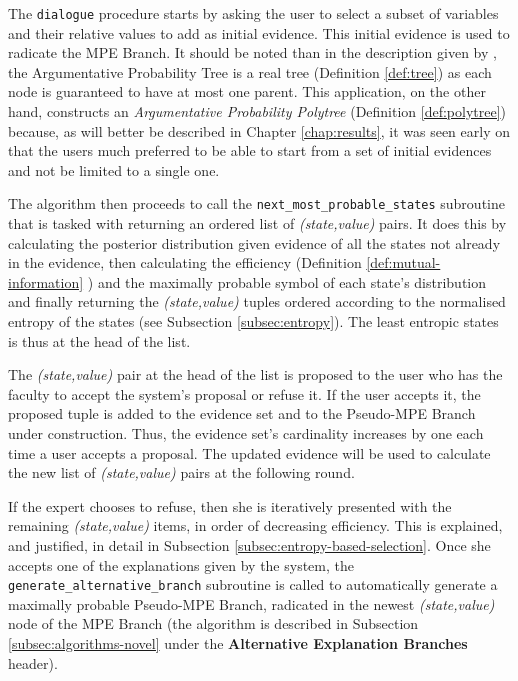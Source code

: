 The \texttt{dialogue} procedure starts by asking the user to select a subset of variables and their relative values to add as initial evidence.
This initial evidence is used to radicate the MPE Branch.
It should be noted than in the description given by \citet{Butz2018}, the Argumentative Probability Tree is a real tree (Definition \ref{def:tree}) as each node is guaranteed to have at most one parent.
This application, on the other hand, constructs an \textit{Argumentative Probability Polytree} (Definition \ref{def:polytree}) because, as will better be described in Chapter \ref{chap:results}, it was seen early on that the users much preferred to be able to start from a set of initial evidences and not be limited to a single one.

The algorithm then proceeds to call the \texttt{next\_most\_probable\_states} subroutine that is tasked with returning an ordered list of \textit{(state,value)} pairs.
It does this by calculating the posterior distribution given evidence of all the states not already in the evidence, then calculating the efficiency (Definition \ref{def:mutual-information} ) and the maximally probable symbol of each state's distribution and finally returning the \textit{(state,value)} tuples ordered according to the normalised entropy of the states (see Subsection \ref{subsec:entropy}).
The least entropic states is thus at the head of the list.

The \textit{(state,value)} pair at the head of the list is proposed to the user who has the faculty to accept the system's proposal or refuse it.
If the user accepts it, the proposed tuple is added to the evidence set and to the Pseudo-MPE Branch under construction.
Thus, the evidence set's cardinality increases by one each time a user accepts a proposal.
The updated evidence will be used to calculate the new list of \textit{(state,value)} pairs at the following round.

If the expert chooses to refuse, then she is iteratively presented with the remaining \textit{(state,value)} items, in order of decreasing efficiency. 
This is explained, and justified, in detail in Subsection \ref{subsec:entropy-based-selection}.
Once she accepts one of the explanations given by the system, the \texttt{generate\_alternative\_branch} subroutine is called to automatically generate a maximally probable Pseudo-MPE Branch, radicated in the newest \textit{(state,value)} node of the MPE Branch (the algorithm is described in Subsection \ref{subsec:algorithms-novel} under the \textbf{Alternative Explanation Branches} header).

